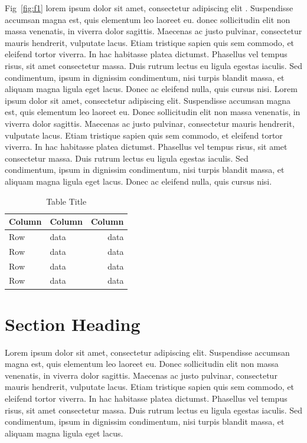 \documentclass{article}
\begin{document}
Fig~\ref{fig:f1} lorem ipsum dolor sit amet, consectetur adipiscing elit \citep{AuthorYear}. Suspendisse accumsan magna est, quis elementum leo laoreet eu. \cite{Author2year2} donec sollicitudin elit non massa venenatis, in viverra dolor sagittis. Maecenas ac justo pulvinar, consectetur mauris hendrerit, vulputate lacus. Etiam tristique sapien quis sem commodo, et eleifend tortor viverra. In hac habitasse platea dictumst. Phasellus vel tempus risus, sit amet consectetur massa. Duis rutrum lectus eu ligula egestas iaculis. Sed condimentum, ipsum in dignissim condimentum, nisi turpis blandit massa, et aliquam magna ligula eget lacus. Donec ac eleifend nulla, quis cursus nisi. Lorem ipsum dolor sit amet, consectetur adipiscing elit. Suspendisse accumsan magna est, quis elementum leo laoreet eu. Donec sollicitudin elit non massa venenatis, in viverra dolor sagittis. Maecenas ac justo pulvinar, consectetur mauris hendrerit, vulputate lacus. Etiam tristique sapien quis sem commodo, et eleifend tortor viverra. In hac habitasse platea dictumst. Phasellus vel tempus risus, sit amet consectetur massa. Duis rutrum lectus eu ligula egestas iaculis. Sed condimentum, ipsum in dignissim condimentum, nisi turpis blandit massa, et aliquam magna ligula eget lacus. Donec ac eleifend nulla, quis cursus nisi.

\begin{table}[t]
\centering
\caption{Table Title}
\begin{tabular*}{ 0.5 \textwidth}{llr}
\hline
Column    & Column & Column \\
\hline
Row      & data    & data      \\
Row      & data    & data       \\
Row      & data    & data      \\
Row      & data    & data       \\
\hline
\end{tabular*}
\label{table:t1}
\end{table}


\section{Section Heading}

Lorem ipsum dolor sit amet, consectetur adipiscing elit. Suspendisse accumsan magna est, quis elementum leo laoreet eu. Donec sollicitudin elit non massa venenatis, in viverra dolor sagittis. Maecenas ac justo pulvinar, consectetur mauris hendrerit, vulputate lacus. Etiam tristique sapien quis sem commodo, et eleifend tortor viverra. In hac habitasse platea dictumst. Phasellus vel tempus risus, sit amet consectetur massa. Duis rutrum lectus eu ligula egestas iaculis. Sed condimentum, ipsum in dignissim condimentum, nisi turpis blandit massa, et aliquam magna ligula eget lacus.
\end{document}
